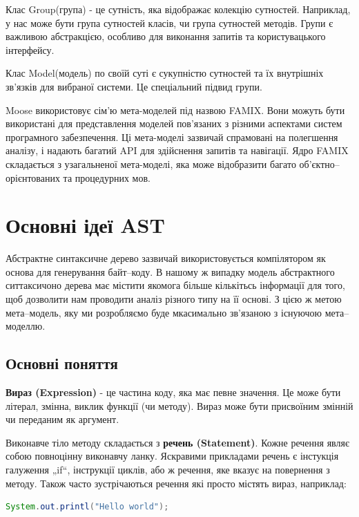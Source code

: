 \documentclass[12pt,a4paper]{article}
\begin{document}
Клас Group(група) - це сутність, яка відображає колекцію сутностей. Наприклад, у нас може бути група сутностей класів, чи група сутностей методів. Групи є важливою абстракцією, особливо для виконання запитів та користувацького інтерфейсу.

Клас Model(модель) по своїй суті є сукупністю сутностей та їх внутрішніх зв'язків для вибраної системи. Це спеціальний підвид групи.

Moose використовує сім'ю мета-моделей під назвою FAMIX. Вони можуть бути використані для представлення моделей пов'язаних з різними аспектами систем програмного забезпечення. Ці мета-моделі зазвичай спрамовані на полегшення аналізу,  і надають багатий API для здійснення запитів та навігації. Ядро FAMIX складається з узагальненої мета-моделі, яка може відобразити багато об'єктно--орієнтованих та процедурних мов. 

\clearpage

\section{Основні ідеї AST}
Абстрактне синтаксичне дерево зазвичай використовується компілятором як основа для генерування байт--коду. В нашому ж випадку модель абстрактного ситтаксичоно дерева має містити якомога більше кількітьсь інформації для того, щоб дозволити нам проводити аналіз різного типу на її основі. З цією ж метою мета--модель, яку ми розробляємо буде мкасимально зв'язаною з існуючою мета--моделлю.

\subsection{Основні поняття}

\textbf{Вираз (Expression)} - це частина коду, яка має певне значення. Це може бути літерал, змінна, виклик функції (чи методу). Вираз може бути присвоїним змінній чи переданим як аргумент.

Виконавче тіло методу складається з \textbf{речень (Statement)}. Кожне речення являє собою повноцінну виконавчу ланку. Яскравими прикладами речень є інстукція галуження „if“, інструкції циклів, або ж речення, яке вказує на повернення з методу. Також часто зустрічаються речення які просто містять вираз, наприклад:
\begin{lstlisting}[language=Java]
System.out.printl("Hello world");
\end{lstlisting}
\end{document}
